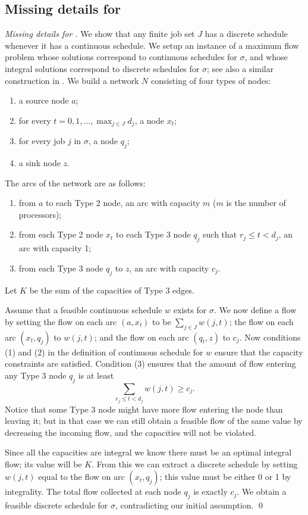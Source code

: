 \documentclass{llncs}
\newcommand{\seq}{\ensuremath{\sigma}}
\begin{document}
\subsection{Missing details for }
\begin{proof}[Missing details for ]
We show that any finite job set $J$ has a discrete schedule whenever it has a continuous schedule. 
We setup an instance of a maximum flow problem whose solutions correspond to continuous schedules for \seq, and whose integral solutions correspond to discrete schedules for \seq; see also a similar construction in \cite{Baruah:1996,Baruah:1990,Horn:1974}.   
We build a network $N$ consisting of four types of nodes: 
\begin{enumerate}
\item a source node $a$; 
\item for every $t=0,1,\ldots,\max_{j \in J} d_j$, a node $x_t$; 
\item for every job $j$ in \seq, a node $q_j$; 
\item a sink node $z$.  
\end{enumerate}
The arcs of the network are as follows:
\begin{enumerate}
\item from $a$ to each Type 2 node, an arc with capacity $m$ ($m$ is the number of processors); 
\item from each Type 2 node $x_t$ to each Type 3 node $q_j$ such that $r_j \le t < d_j$, an arc with capacity 1; 
\item from each Type 3 node $q_j$ to $z$, an arc with capacity $c_j$.  
\end{enumerate}
Let $K$ be the sum of the capacities of Type 3 edges. 

Assume that a feasible continuous schedule $w$ exists for \seq. We now define a flow by setting the flow on each arc $(a,x_t)$ to be $\sum_{j \in J} w(j,t)$; the flow on each arc $(x_t,q_j)$ to $w(j,t)$; and the flow on each arc $(q_t,z)$ to $c_j$. Now conditions (1) and (2) in the definition of continuous schedule for $w$ ensure that the capacity constraints are satisfied. Condition (3) ensures that the amount of flow entering any Type 3 node $q_j$ is at least 
$$ \sum_{r_j \le t < d_j} w(j,t) \ge c_j. $$
Notice that some Type 3 node might have more flow entering the node than leaving it; but in that case we can still obtain a feasible flow of the same value by decreasing the incoming flow, and the capacities will not be violated.   

Since all the capacities are integral we know there must be an optimal integral flow; its value will be $K$. From this we can extract a discrete schedule by setting $w(j,t)$ equal to the flow on arc $(x_t,q_j)$; this value must be either 0 or 1 by integrality. The total flow collected at each node $q_j$ is exactly $c_j$. We obtain a feasible discrete schedule for \seq, contradicting our initial assumption.  
\qed
\end{proof}
\end{document}
